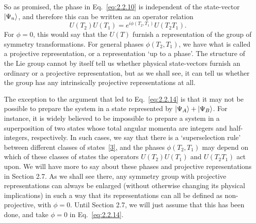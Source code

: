 So as promised, the phase in Eq.~\eqref{eq:2.2.10} is independent of the
state-vector $\lvert \Psi_n\rangle$, and therefore this can be written as an operator
relation
\begin{equation}
  U(T_2)U(T_1)=e^{i\phi(T_2,T_1)}U(T_2T_1).
  \tag{2.2.14}\label{eq:2.2.14}
\end{equation}
For $\phi=0$, this would say that the $U(T)$ furnish a representation of
the group of symmetry transformations. For general phases $\phi(T_2,T_1)$,
we have what is called a projective representation, or a representation
`up to a phase'. The structure of the Lie group cannot by itself tell us
whether physical state-vectors furnish an ordinary or a projective
representation, but as we shall see, it can tell us whether the group has
any intrinsically projective representations at all.

The exception to the argument that led to Eq.~\eqref{eq:2.2.14} is that it may
not be possible to prepare the system in a state represented by
$\lvert \Psi_A\rangle+\lvert \Psi_B\rangle$. For instance, it is widely believed to be
impossible to prepare a system in a superposition of two states whose total
angular momenta are integers and half-integers, respectively. In such
cases, we say that there is a `superselection rule' between different
classes of states~\hyperref[ref:2.3]{[3]}, and the phases $\phi(T_2,T_1)$ may
depend on which of these classes of states the operators $U(T_2)U(T_1)$
and $U(T_2T_1)$ act upon. We will have more to say about these phases and
projective representations in Section 2.7. As we shall see there, any
symmetry group with projective representations can always be enlarged
(without otherwise changing its physical implications) in such a way that
its representations can all be defined as non-projective, with $\phi=0$.
Until Section 2.7, we will just assume that this has been done, and take
$\phi=0$ in Eq.~\eqref{eq:2.2.14}.

